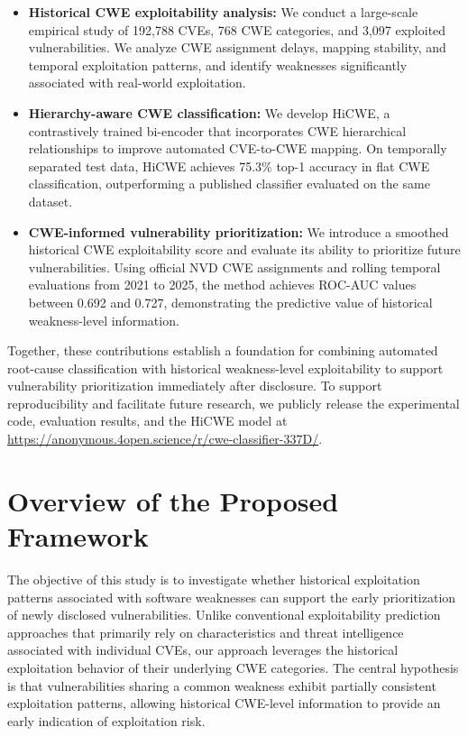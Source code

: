 \documentclass[conference,compsoc]{IEEEtran}
\begin{document}
\begin{itemize}

\item \textbf{Historical CWE exploitability analysis:}
We conduct a large-scale empirical study of
192,788 CVEs, 768 CWE categories, and 3,097
exploited vulnerabilities. We analyze CWE
assignment delays, mapping stability, and
temporal exploitation patterns, and identify
weaknesses significantly associated with
real-world exploitation.

\item \textbf{Hierarchy-aware CWE classification:}
We develop HiCWE, a contrastively trained
bi-encoder that incorporates CWE hierarchical
relationships to improve automated CVE-to-CWE
mapping. On temporally separated test data,
HiCWE achieves 75.3\% top-1 accuracy in flat
CWE classification, outperforming a published
classifier evaluated on the same dataset.

\item \textbf{CWE-informed vulnerability
prioritization:}
We introduce a smoothed historical CWE
exploitability score and evaluate its ability
to prioritize future vulnerabilities.
Using official NVD CWE assignments and rolling
temporal evaluations from 2021 to 2025,
the method achieves ROC-AUC values between
0.692 and 0.727, demonstrating the predictive
value of historical weakness-level information.

\end{itemize}

Together, these contributions establish a
foundation for combining automated root-cause
classification with historical weakness-level
exploitability to support vulnerability
prioritization immediately after disclosure. To support reproducibility and facilitate future research,
we publicly release the experimental code, evaluation
results, and the HiCWE model at
\url{https://anonymous.4open.science/r/cwe-classifier-337D/}.

\section{Overview of the Proposed Framework}
\label{sec:overview}

The objective of this study is to investigate whether
historical exploitation patterns associated with
software weaknesses can support the early prioritization
of newly disclosed vulnerabilities. Unlike conventional
exploitability prediction approaches that primarily
rely on characteristics and threat intelligence
associated with individual CVEs, our approach leverages
the historical exploitation behavior of their underlying
CWE categories. The central hypothesis is that
vulnerabilities sharing a common weakness exhibit
partially consistent exploitation patterns, allowing
historical CWE-level information to provide an early
indication of exploitation risk.
\end{document}

